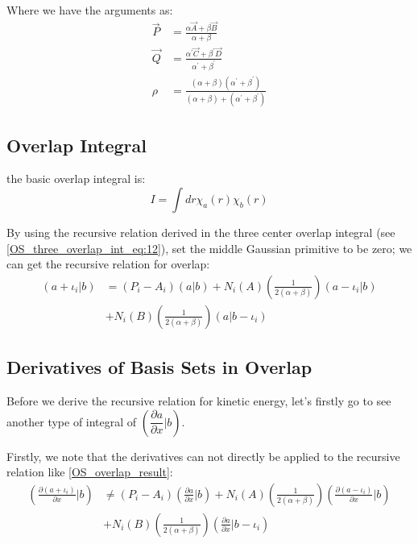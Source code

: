 Where we have the arguments as:
\begin{align}
 \overrightarrow{P} &= \frac{\alpha \overrightarrow{A} + \beta
\overrightarrow{B}}{\alpha + \beta} \nonumber \\
\overrightarrow{Q} &= \frac{\alpha^{'} \overrightarrow{C} + \beta^{'}
\overrightarrow{D}}{\alpha^{'} + \beta^{'}} \nonumber \\
\rho &= \frac{(\alpha+\beta)(\alpha^{'}+\beta^{'})}
{(\alpha+\beta)+(\alpha^{'}+\beta^{'})}
\end{align}
    
\subsection{Overlap Integral}
%
%
%
the basic overlap integral is:
\begin{equation}
 \label{OS_overlap_eq:1}
I = \int dr \chi_{a}(r) \chi_{b}(r)
\end{equation}

By using the recursive relation derived in the three center overlap
integral (see \ref{OS_three_overlap_int_eq:12}), set the middle Gaussian
primitive to be zero; we can get the recursive relation for overlap:
\begin{equation}
\begin{split}
(a+\iota_{i}|b) &= 
(P_{i} - A_{i})(a|b) + 
N_{i}(A)\left(\frac{1}{2(\alpha+\beta)}\right)(a-\iota_{i}|b) \\
&+ 
N_{i}(B)\left(\frac{1}{2(\alpha+\beta)}\right)(a|b-\iota_{i})  
\end{split}
\label{OS_overlap_result}
\end{equation}

\subsection{Derivatives of Basis Sets in Overlap}
%
%
%
Before we derive the recursive relation for kinetic energy, let's firstly 
go to see another type of integral of 
$\left( \dfrac{\partial a}{\partial x}|b\right)$.

Firstly, we note that the derivatives can not directly be applied to the 
recursive relation like \ref{OS_overlap_result}:
\begin{equation}
\begin{split}
(\frac{\partial (a+\iota_{i})}{\partial x}|b) & \neq 
(P_{i} - A_{i})(\frac{\partial a}{\partial x}|b) + 
N_{i}(A)\left(\frac{1}{2(\alpha+\beta)}\right)(\frac{\partial(a-\iota_{i})}{\partial x}|b) \\
&+ 
N_{i}(B)\left(\frac{1}{2(\alpha+\beta)}\right)(\frac{\partial a}{\partial x}|b-\iota_{i})  
\end{split}
\end{equation}

